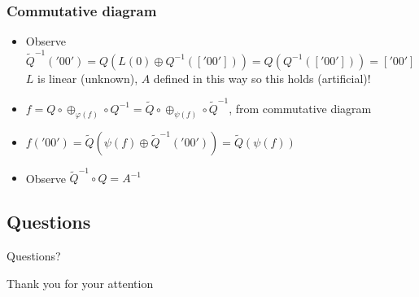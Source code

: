 \documentclass{beamer}
\begin{document}
\begin{frame}\frametitle{Commutative diagram}    
    \centerline{}
    \bigskip
    \begin{itemize}
    \item Observe $\widetilde{Q}^{-1}('00') = Q(L(0) \oplus Q^{-1}(['00'])) = Q(Q^{-1}(['00'])) = ['00']$\\
	$L$ is linear (unknown), $A$ defined in this way so this holds (artificial)! \pause
     \item $f = Q \circ \oplus_{\varphi(f)} \circ Q^{-1} = \widetilde{Q} \circ \oplus_{\psi(f)} \circ \widetilde{Q}^{-1} $, from commutative diagram \pause
     \item $f('00') = \widetilde{Q}( \psi(f) \oplus \widetilde{Q}^{-1}('00')) = \widetilde{Q}( \psi(f) )$ \pause
     \item Observe $\widetilde{Q}^{-1} \circ Q = A^{-1}$ 
    \end{itemize}
\end{frame}

\subsection{Questions}
\begin{frame}
  \begin{center}
    Questions?
  \end{center}
\end{frame}

\begin{frame}
  \begin{center}
    Thank you for your attention
  \end{center}
\end{frame}
\end{document}
